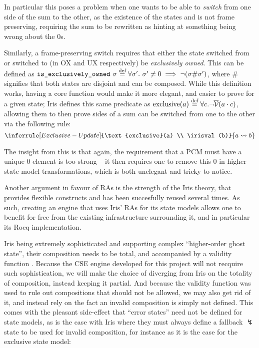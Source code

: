 In particular this poses a problem when one wants to be able to \emph{switch} from one side of the sum to the other, as the existence of the states  and  is not frame preserving, requiring the sum to be rewritten as  hinting at something being wrong about the $0$s. 

Similarly, a frame-preserving switch requires that either the state switched from or switched to (in OX and UX respectively) be \emph{exclusively owned}. This can be defined as $\texttt{is\_exclusively\_owned} ~\sigma \stackrel{\textnormal{def}}= \forall \sigma'.~\sigma'\neq 0\implies \neg(\sigma\#\sigma')$, where $\#$ signifies that both states are disjoint and can be composed. While this definition works, having a core function would make it more elegant, and easier to prove for a given state; Iris defines this same predicate as $\text{exclusive}(a)\stackrel{\textnormal{def}}=\forall c.\neg\overline{\cal V}(a\cdot c)$, allowing them to then prove sides of a sum can be switched from one to the other via the following rule:
\[
\inferrule[Exclusive-Update]
	{\text{exclusive}(a) \\ \irisval(b)}
	{a \rightsquigarrow b}
\]

The insight from this is that again, the requirement that a PCM must have a unique $0$ element is too strong -- it then requires one to remove this $0$ in higher state model transformations, which is both unelegant and tricky to notice.

Another argument in favour of RAs is the strength of the Iris theory, that provides flexible constructs and has been succesfully reused several times. As such, creating an engine that uses Iris' RAs for its state models allows one to benefit for free from the existing infrastructure surrounding it, and in particular its Rocq implementation.

Iris being extremely sophisticated and supporting complex ``higher-order ghost state'', their composition needs to be total, and accompanied by a validity function \irisval. Because the CSE engine developed for this project will not recquire such sophistication, we will make the choice of diverging from Iris on the totality of composition, instead keeping it partial. And because the validity function was used to rule out compositions that should not be allowed, we may also get rid of it, and instead rely on the fact an invalid composition is simply not defined. This comes with the pleasant side-effect that ``error states'' need not be defined for state models, as is the case with Iris where they must always define a fallback $\lightning$ state to be used for invalid composition, for instance as it is the case for the exclusive state model:

